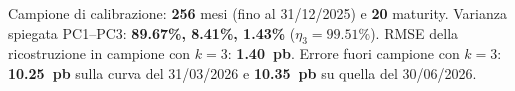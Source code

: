 Campione di calibrazione: \textbf{256} mesi (fino al 31/12/2025) e \textbf{20} maturity.
Varianza spiegata PC1--PC3: \textbf{89.67\%, 8.41\%, 1.43\%} ($\eta_3 = 99.51\%$).
RMSE della ricostruzione in campione con $k=3$: \textbf{1.40~pb}.
Errore fuori campione con $k=3$: \textbf{10.25~pb} sulla curva del 31/03/2026 e \textbf{10.35~pb} su quella del 30/06/2026.
